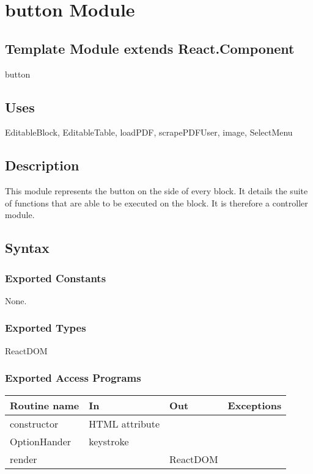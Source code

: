 \documentclass[12pt, titlepage]{article}
\begin{document}
\newpage

\section{button Module}

\subsection{Template Module extends React.Component}

button

\subsection{Uses}

EditableBlock, EditableTable, loadPDF, scrapePDFUser, image, SelectMenu

\subsection{Description}
This module represents the button on the side of every block. It details the suite of functions that are able to be executed on the block. It is therefore a controller module.

\subsection{Syntax}

\subsubsection{Exported Constants}

None.

\subsubsection{Exported Types}

ReactDOM

\subsubsection{Exported Access Programs}

\begin{tabular}{| l | l | l | l |}
  \hline
  \textbf{Routine name} & \textbf{In} & \textbf{Out} & \textbf{Exceptions}\\
  \hline
  constructor & HTML attribute & ~ & ~\\
  \hline
  OptionHander & keystroke & ~ & ~\\
  \hline
  render & ~ & ReactDOM & ~\\
  \hline
\end{tabular}
\end{document}
